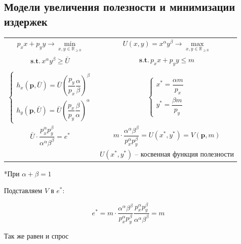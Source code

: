 \documentclass[reqno]{article}
\theoremstyle{definition}
\theoremstyle{definition}
\theoremstyle{definition}
\theoremstyle{definition}
\theoremstyle{definition}
\theoremstyle{definition}
\theoremstyle{definition}
\theoremstyle{definition}
\theoremstyle{definition}
\begin{document}
	\subsection{Модели увеличения полезности и минимизации издержек}
	
	
	\begin{table}[h!] 
		
		\centering
		\begin{tabular}{c|c}
		
		 $ p_x x + p_y y \rightarrow \min\limits_{x,y \in\mathds{R}_{\geq 0}}$ & $ U(x,y)=x^\alpha y^\beta \rightarrow \max\limits_{x,y \in\mathds{R}_{\geq 0}} $ \\
		 
		$ \textbf{s.t.} \, x^\alpha y^\beta \geq \bar{U} $ & $ \textbf{s.t.} \, p_x x + p_y y \leq m $\\ \hline
		
		\\
		
		$ \begin{cases} 
			h_x(\textbf{p},\bar{U}) = \bar{U} \left( \dfrac{p_y}{p_x} \dfrac{\alpha}{\beta} \right)^\beta \\ 
			h_y(\textbf{p},\bar{U}) = \bar{U} \left( \dfrac{p_x}{p_y} \dfrac{\beta}{\alpha} \right)^\alpha
		\end{cases}
		$
		&
		$ \begin{cases} 
			x^* =  \dfrac{\alpha m}{p_x} \\ 
			y^* =  \dfrac{\beta m}{p_y} 
		\end{cases}
		$
		\\
		
		$\bar{U} \cdot \dfrac{p_x^\alpha p_y^\beta}{\alpha^\alpha \beta^\beta} = e^*$
		&
		$m \cdot \dfrac{\alpha^\alpha \beta^\beta}{p_x^\alpha p_y^\beta} = U(x^*,y^*) = V(\textbf{p},m)$
		\\
		
		&$U(x^*,y^*)$ -- косвенная функция полезности
		
		\end{tabular}
	
	\end{table}
	
	*При $\alpha + \beta = 1$
	
	Подставляем $V$ в $e^*$:
	
	$$e^* = m \cdot \dfrac{\alpha^\alpha \beta^\beta}{p_x^\alpha p_y^\beta} \dfrac{p_x^\alpha p_y^\beta}{\alpha^\alpha \beta^\beta} = m $$
	
	Так же равен и спрос
	
\end{document}
